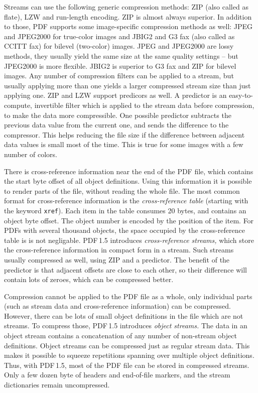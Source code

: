 \documentclass{ltugproc}
\begin{document}
Streams can use the following generic compression methods: ZIP (also called
as flate), LZW and run-length encoding. ZIP is almost always superior. In
addition to those, PDF supports some image-specific compression methods as
well: JPEG and JPEG2000 for true-color images and JBIG2 and G3 fax (also
called as CCITT fax) for bilevel (two-color) images. JPEG and JPEG2000 are
lossy methods, they usually yield the same size at the same quality
settings -- but JPEG2000 is more flexible. JBIG2 is superior to G3 fax and
ZIP for bilevel images. Any number of compression filters can be applied to
a stream, but usually applying more than one yields a larger compressed
stream size than just applying one. ZIP and LZW support predicors as well. A
predictor is an easy-to-compute, invertible filter which is applied to the
stream data before compression, to make the data more compressible. One
possible predictor subtracts the previous data value from the current one,
and sends the difference to the compressor. This helps reducing the file
size if the difference between adjacent data values is small most of the
time. This is true for some images with a few number of colors.

There is cross-reference information near the end of the PDF file, which
contains the start byte offset of all object definitions. Using this
information it is possible to render parts of the file, without reading the
whole file. The most common format for cross-reference information is the
\emph{cross-reference table} (starting with the keyword \texttt{xref}). Each item
in the table consumes 20 bytes, and contains an object byte offset. The
object number is encoded by the position of the item. For PDFs with several
thousand objects, the space occupied by the cross-reference table is is not
negligable. PDF\,1.5 introduces \emph{cross-reference streams,} which store
the cross-reference information in compact form in a stream. Such streams
usually compressed as well, using ZIP and a predictor. The benefit of the
predictor is that adjacent offsets are close to each other, so their
difference will contain lots of zeroes, which can be compressed better.

Compression cannot be applied to the PDF file as a whole, only individual
parts (such as stream data and cross-reference information) can be
compressed. However, there can be lots of small object definitions in the
file which are not streams. To compress those, PDF\,1.5 introduces
\emph{object streams.} The data in an object stream contains a concatenation
of any number of non-stream object definitions. Object streams can be
compressed just as regular stream data. This makes it possible to squeeze
repetitions spanning over multiple object definitions. Thus, with PDF\,1.5,
most of the PDF file can be stored in compressed streams. Only a few dozen
byte of headers and end-of-file markers, and the stream dictionaries remain
uncompressed.
\end{document}
